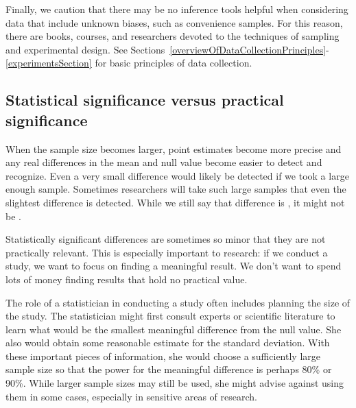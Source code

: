 Finally, we caution that there may be no inference tools helpful when considering data that include unknown biases, such as convenience samples. For this reason, there are books, courses, and researchers devoted to the techniques of sampling and experimental design. See Sections~\ref{overviewOfDataCollectionPrinciples}-\ref{experimentsSection} for basic principles of data collection.


\subsection{Statistical significance versus practical significance}

When the sample size becomes larger, point estimates become more precise and any real differences in the mean and null value become easier to detect and recognize. Even a very small difference would likely be detected if we took a large enough sample. Sometimes researchers will take such large samples that even the slightest difference is detected. While we still say that difference is , it might not be .

Statistically significant differences are sometimes so minor that they are not practically relevant. This is especially important to research: if we conduct a study, we want to focus on finding a meaningful result. We don't want to spend lots of money finding results that hold no practical value.

The role of a statistician in conducting a study often includes planning the size of the study. The statistician might first consult experts or scientific literature to learn what would be the smallest meaningful difference from the null value. She also would obtain some reasonable estimate for the standard deviation. With these important pieces of information, she would choose a sufficiently large sample size so that the power for the meaningful difference is perhaps 80\% or 90\%. While larger sample sizes may still be used, she might advise against using them in some cases, especially in sensitive areas of research.

